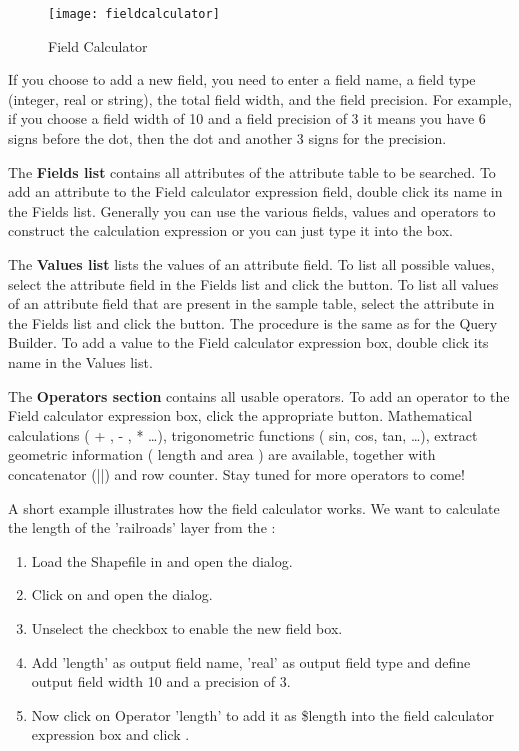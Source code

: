 \begin{figure}[ht]
  \centering
    \texttt{[image: fieldcalculator]}
    \caption{Field Calculator \nixcaption}\label{fig:field_calculator}
\end{figure}

If you choose to add a new field, you need to enter a field name, a field type
(integer, real or string), the total field width, and the field precision.
For example, if you choose a field width of 10 and a field precision of 3 it
means you have 6 signs before the dot, then the dot and another 3 signs for the
precision.

The \textbf{Fields list} contains all attributes of the attribute table to be
searched. To add an attribute to the Field calculator expression field, double
click its name in the Fields list. Generally you can use the various fields,
values and operators to construct the calculation expression or you can just
type it into the box.

The \textbf{Values list} lists the values of an attribute field. To list all
possible values, select the attribute field in the Fields list and click the
 button. To list all
values of an attribute field that are present in the sample table, select the
attribute in the Fields list and click the  button. The procedure is the same as for the Query
Builder. To add a value to the Field calculator expression box, double click its
name in the Values list.

The \textbf{Operators section} contains all usable operators. To add an operator
to the Field calculator expression box, click the appropriate button. Mathematical
calculations ( + , - , * \dots), trigonometric functions ( sin, cos, tan, \dots),
extract geometric information ( length and area ) are available, together with
concatenator (||) and row counter. Stay tuned for more operators to come!

A short example illustrates how the field calculator works. We want to calculate
the length of the 'railroads' layer from the :

\begin{enumerate}
\item Load the Shapefile  in \qg and open
the  dialog.
\item Click on  and
open the  dialog.
\item Unselect the  checkbox to enable the
new field box.
\item Add 'length' as output field name, 'real' as output field type and define
output field width 10 and a precision of 3.
\item Now click on Operator 'length' to add it as \$length into the
field calculator expression box and click .
\end{enumerate}
